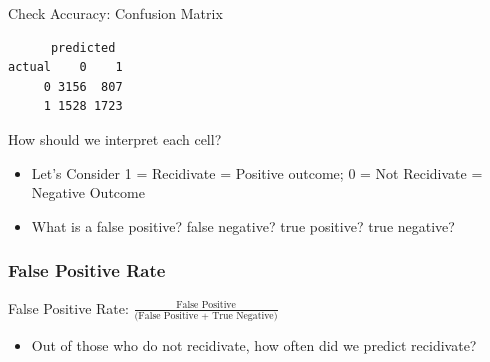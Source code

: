 \documentclass[
  letterpaper,
  DIV=11,
  numbers=noendperiod]{scrreprt}
\newenvironment{Shaded}{\begin{snugshade}}{\end{snugshade}}
\newcommand{\AttributeTok}[1]{\textcolor[rgb]{0.40,0.45,0.13}{#1}}
\newcommand{\DecValTok}[1]{\textcolor[rgb]{0.68,0.00,0.00}{#1}}
\newcommand{\DocumentationTok}[1]{\textcolor[rgb]{0.37,0.37,0.37}{\textit{#1}}}
\newcommand{\FunctionTok}[1]{\textcolor[rgb]{0.28,0.35,0.67}{#1}}
\newcommand{\NormalTok}[1]{\textcolor[rgb]{0.00,0.23,0.31}{#1}}
\newcommand{\OtherTok}[1]{\textcolor[rgb]{0.00,0.23,0.31}{#1}}
\newcommand{\SpecialCharTok}[1]{\textcolor[rgb]{0.37,0.37,0.37}{#1}}
\providecommand{\tightlist}{%
  \setlength{\itemsep}{0pt}\setlength{\parskip}{0pt}}\usepackage{longtable,booktabs,array}
\begin{document}
Check Accuracy: Confusion Matrix

\begin{Shaded}
\end{Shaded}

\begin{verbatim}
      predicted
actual    0    1
     0 3156  807
     1 1528 1723
\end{verbatim}

How should we interpret each cell?

\begin{itemize}
\tightlist
\item
  Let's Consider 1 = Recidivate = Positive outcome; 0 = Not Recidivate =
  Negative Outcome
\item
  What is a false positive? false negative? true positive? true
  negative?
\end{itemize}

\hypertarget{false-positive-rate}{%
\subsubsection{False Positive Rate}\label{false-positive-rate}}

False Positive Rate:
\(\frac{\text{False Positive}}{\text{(False Positive + True Negative)}}\)

\begin{itemize}
\tightlist
\item
  Out of those who do not recidivate, how often did we predict
  recidivate?
\end{itemize}

\begin{Shaded}
\end{Shaded}
\end{document}
